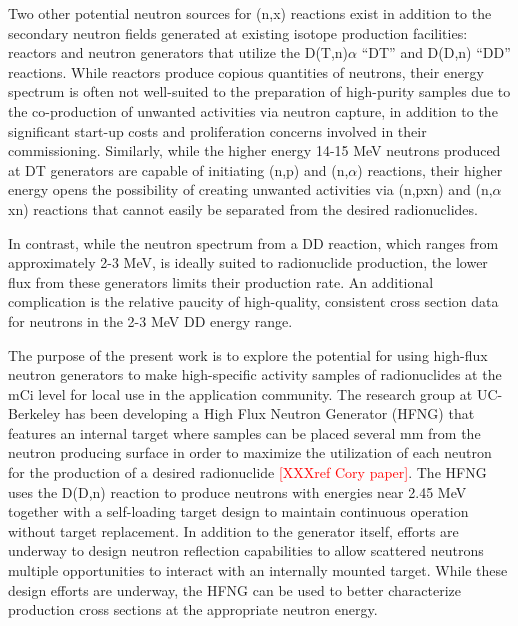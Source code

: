 \documentclass[5p]{elsarticle}
\newcommand{\comment}[1]{\todo[color=blue!20!white,inline]{ASV: #1}}
\begin{document}
Two other potential neutron sources for (n,x) reactions exist in addition to the secondary neutron fields generated at existing isotope production facilities: reactors and neutron generators that utilize the D(T,n)$\alpha$ \enquote{DT} and D(D,n) \enquote{DD} reactions.  While reactors produce copious quantities of neutrons, their energy spectrum is often not well-suited to the preparation of high-purity samples due to the co-production of unwanted activities via neutron capture, in addition to the significant start-up costs and proliferation concerns involved in their commissioning.  Similarly, while the higher energy 14-15 MeV neutrons produced at DT generators are capable of initiating (n,p) and (n,$\alpha$) reactions, their higher energy opens the possibility of creating unwanted activities via (n,pxn) and (n,$\alpha$xn) reactions that cannot easily be separated from the desired radionuclides.  

In contrast, while the neutron spectrum from a DD reaction, which ranges from approximately 2-3 MeV, is ideally suited to radionuclide production, the lower flux from these generators limits their production rate.  An additional complication is the relative paucity of high-quality, consistent cross section data for neutrons in the 2-3 MeV DD energy range.  

The purpose of the present work is to explore the potential for using high-flux neutron generators to make high-specific activity samples of radionuclides at the mCi level for local use in the application community.  The research group at UC-Berkeley has been developing a High Flux Neutron Generator (HFNG) that features an internal target where samples can be placed several mm from the neutron producing surface in order to maximize the utilization of each neutron for the production of a desired radionuclide \textcolor{red}{[XXXref Cory paper]}.  The HFNG uses the D(D,n) reaction to produce neutrons with energies near 2.45 MeV together with a self-loading target design to maintain continuous operation without target replacement.  In addition to the generator itself, efforts are underway to design neutron reflection capabilities to allow scattered neutrons multiple opportunities to interact with an  internally mounted target. While these design efforts are underway, the HFNG can be used to better characterize production cross sections at the appropriate neutron energy.

\comment{cite Cory's paper}
\end{document}
